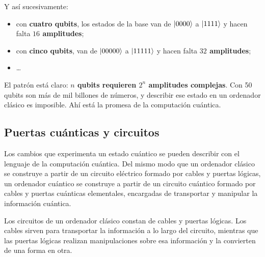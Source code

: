 Y así sucesivamente:
\begin{itemize}
    \item con \textbf{cuatro qubits}, los estados de la base van de $\ket{0000}$ a
          $\ket{1111}$ y hacen falta \textbf{$16$ amplitudes};
    \item con \textbf{cinco qubits}, van de $\ket{00000}$ a $\ket{11111}$ y hacen falta
          \textbf{$32$ amplitudes};
    \item \dots
\end{itemize}

El patrón está claro: \textbf{$n$ qubits requieren $2^n$ amplitudes complejas}. Con 50
qubits son más de mil billones de números, y describir ese estado en un ordenador clásico
es imposible. Ahí está la promesa de la computación cuántica.

\subsection{Puertas cuánticas y circuitos}
\label{sec:puertas}
%
Los cambios que experimenta un estado cuántico se pueden describir con el lenguaje de la
computación cuántica. Del mismo modo que un ordenador clásico se construye a partir de un
circuito eléctrico formado por cables y puertas lógicas, un ordenador cuántico se construye
a partir de un circuito cuántico formado por cables y puertas cuánticas elementales,
encargadas de transportar y manipular la información cuántica.

Los circuitos de un ordenador clásico constan de cables y puertas lógicas. Los cables
sirven para transportar la información a lo largo del circuito, mientras que las puertas
lógicas realizan manipulaciones sobre esa información y la convierten de una forma en otra.



